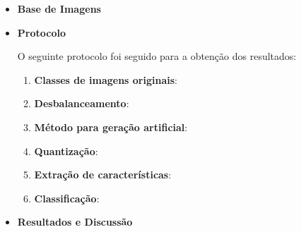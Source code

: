 \begin{itemize}
\item[] \textbf{Base de Imagens}


\item[] \textbf{Protocolo}

O seguinte protocolo foi seguido para a obtenção dos resultados:

\begin{enumerate}
\item \textbf{Classes de imagens originais}:
\item \textbf{Desbalanceamento}:
\item \textbf{Método para geração artificial}:
\item \textbf{Quantização}:
\item \textbf{Extração de características}:
\item \textbf{Classificação}:
\end{enumerate}
\item[] \textbf{Resultados e Discussão}


\end{itemize}

